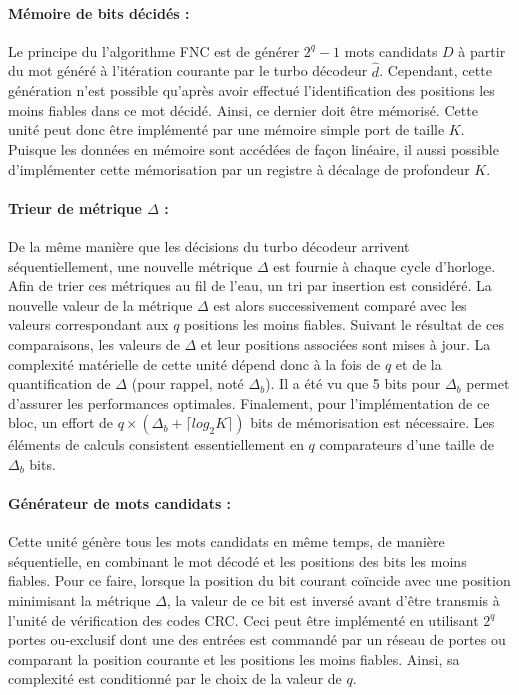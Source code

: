\paragraph*{Mémoire de bits décidés :} Le principe du l'algorithme FNC est de générer $2^q-1$ mots candidats $D$ à partir 
du mot généré à l'itération courante par le turbo décodeur $\hat{d}$. Cependant, cette génération n'est possible 
qu'après avoir effectué  l'identification des positions les moins fiables dans ce mot décidé. Ainsi, ce dernier doit 
être mémorisé. Cette unité peut donc être implémenté par une mémoire simple port de taille $K$. Puisque les données en 
mémoire sont accédées de façon linéaire, il aussi possible d'implémenter cette mémorisation par un registre à décalage 
de profondeur $K$.
\paragraph*{Trieur de métrique $\Delta$ :} De la même manière que les décisions du turbo décodeur arrivent 
séquentiellement, une nouvelle métrique $\Delta$ est fournie à chaque cycle d'horloge. Afin de trier ces métriques au
fil de l'eau, un tri par insertion est considéré. La nouvelle valeur de la métrique $\Delta$ est alors successivement 
comparé avec les  valeurs correspondant aux $q$ positions les moins fiables. Suivant le résultat de ces comparaisons, 
les valeurs de $\Delta$ et leur positions associées sont mises à jour. La complexité matérielle de cette unité dépend donc 
à la fois de $q$ et de la quantification de $\Delta$ (pour rappel, noté $\Delta_b$). Il a été vu que 5 bits 
pour $\Delta_b$ permet d'assurer les performances optimales. Finalement, pour l'implémentation de ce bloc, un effort de 
$q\times(\Delta_b + \lceil log_2{K} \rceil)$ bits de mémorisation est nécessaire. Les éléments de calculs consistent 
essentiellement en $q$ comparateurs d'une taille de $\Delta_b$ bits.
\paragraph*{Générateur de mots candidats :} Cette unité génère tous les mots candidats en même temps, de manière 
séquentielle, en combinant le mot décodé et les positions des bits les moins fiables. Pour ce faire, lorsque la position 
du bit courant coïncide avec une position minimisant la métrique $\Delta$, la valeur de ce bit est inversé avant d'être
transmis à l'unité de vérification des codes CRC. Ceci peut être implémenté en utilisant $2^q$ portes ou-exclusif dont 
une des entrées est commandé par un réseau de portes ou comparant la position courante et les positions les moins 
fiables. Ainsi, sa complexité est conditionné par le choix de la valeur de $q$.
